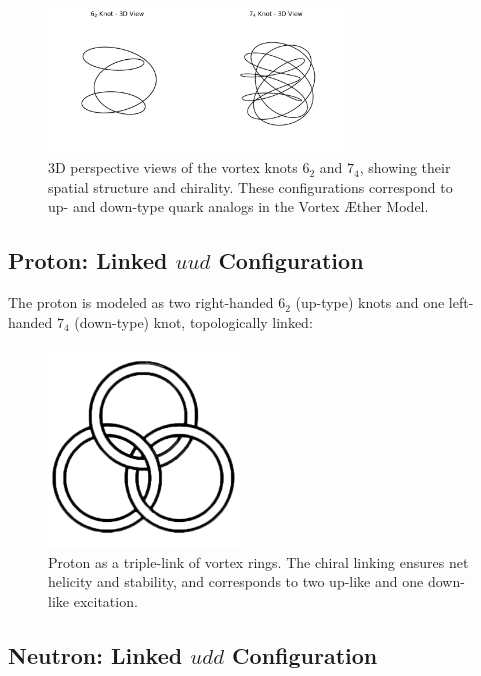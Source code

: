 \begin{figure}[H]
    \centering
    \includegraphics[width=0.7\textwidth]{images/knots_6_2_and_7_4_3D}
    \caption{3D perspective views of the vortex knots \(6_2\) and \(7_4\), showing their spatial structure and chirality. These configurations correspond to up- and down-type quark analogs in the Vortex \AE ther Model.}
\end{figure}


\subsection{Proton: Linked \(uud\) Configuration}

The proton is modeled as two right-handed \( 6_2 \) (up-type) knots and one left-handed \( 7_4 \) (down-type) knot, topologically linked:

\begin{figure}[H]
    \centering
    \includegraphics[width=0.45\textwidth]{images/aborromean}
    \caption{Proton as a triple-link of vortex rings. The chiral linking ensures net helicity and stability, and corresponds to two up-like and one down-like excitation.}
\end{figure}

\subsection{Neutron: Linked \(udd\) Configuration}


